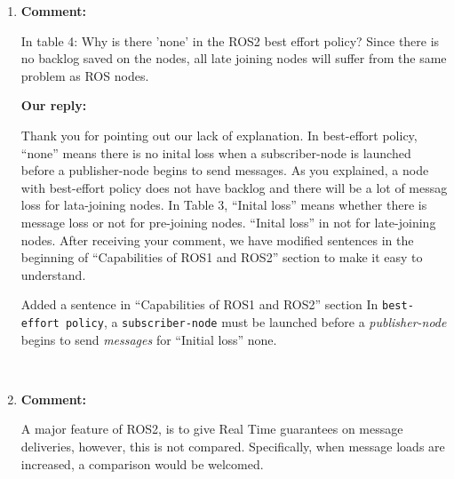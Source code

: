 \documentclass{article}
\begin{document}
\begin{enumerate}
\item \begin{flushleft}
  \textbf{Comment:}
\end{flushleft}
  In table 4: Why is there 'none' in the ROS2 best effort policy? Since there is no backlog saved on the nodes, all late joining nodes will suffer from the same problem as ROS nodes.

  \begin{flushleft}
    \textbf{Our reply:}
  \end{flushleft}
  Thank you for pointing out our lack of explanation.
  In best-effort policy, ``none'' means there is no inital loss when a subscriber-node is launched before a publisher-node begins to send messages.
  As you explained, a node with best-effort policy does not have backlog and there will be a lot of messag loss for lata-joining nodes.
  In Table 3, ``Inital loss'' means whether there is message loss or not for pre-joining nodes.
  ``Inital loss'' in not for late-joining nodes.
  After receiving your comment, we have modified sentences in the beginning of ``Capabilities of ROS1 and ROS2'' section to make it easy to understand.
  \begin{itembox}[|]{Added a sentence in ``Capabilities of ROS1 and ROS2'' section}
    In \texttt{best-effort policy}, a \texttt{subscriber-node} must be launched before a \emph{publisher-node} begins to send \emph{messages} for ``Initial loss'' none.
  \end{itembox}\\

\item \begin{flushleft}
  \textbf{Comment:}
\end{flushleft}
  A major feature of ROS2, is to give Real Time guarantees on message deliveries, however, this is not compared. Specifically, when message loads are increased, a comparison would be welcomed.


\end{enumerate}
\end{document}
